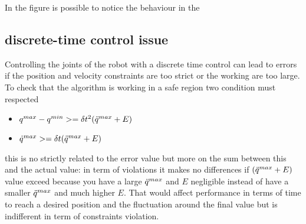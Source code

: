 \documentclass{article}
\begin{document}
In the figure is possible to notice the behaviour in the 
\subsection{discrete-time control issue}
Controlling the joints of the robot with a discrete time control can lead to errors if the position and velocity constraints are too strict or the working \dt are too large. To check that the algorithm is working in a safe region two condition must respected
\begin{itemize}
\item $ q^{max} -q^{min}>=\delta t^2(\ddot{q}^{max} +E) $
\item $\dot{q}^{max}>=\delta t (\ddot{q}^{max}+E)$
\end{itemize}
this is no strictly related to the error value but more on the sum between this and the actual value: in term of violations it makes no differences if $(\ddot{q}^{max}+E)$ value exceed because you have a large $\ddot{q}^{max}$ and $E$ negligible instead of have a smaller $\ddot{q}^{max}$ and much higher $E$. That would affect performance in terms of time to reach a desired position and the fluctuation around the final value but is indifferent in term of constraints violation.
\end{document}
